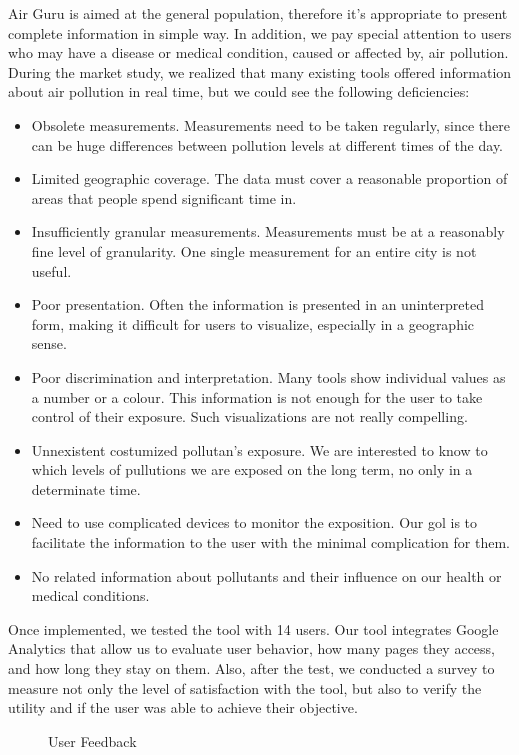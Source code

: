 Air Guru is aimed at the general population, therefore it's appropriate to present complete information in simple way. In addition, we pay special attention to users who may have a
disease or medical condition, caused or affected by, air pollution.
During the market study, we realized that many existing tools offered information about air pollution in real time, but we could see the following deficiencies:
\begin{itemize}
    \item Obsolete measurements. Measurements need to be taken regularly, since there can be huge differences
    between pollution levels at different times of the day.
    \item Limited geographic coverage. The data must cover a reasonable proportion of areas that people spend significant time in.
    \item Insufficiently granular measurements. Measurements must be at a reasonably fine level of granularity. One single measurement for an entire city is not useful.
    \item Poor presentation. Often the information is presented in an uninterpreted form, making it difficult for users to visualize, especially in a geographic sense.
    \item Poor discrimination and interpretation. Many tools show individual values as a number or a colour. This information is not
    enough for the user to take control of their exposure. Such visualizations are not really compelling. 
    \item Unnexistent costumized pollutan's exposure. We are interested to know to which levels of pullutions we are exposed on the long term, no only in a determinate time.
    \item Need to use complicated devices to monitor the exposition. Our gol is to facilitate the information to the user with the minimal complication for them.
    \item No related information about pollutants and their influence on our health or medical conditions.
\end{itemize}

Once implemented, we tested the tool with 14 users. Our tool integrates Google Analytics that allow us to evaluate
user behavior, how many pages they access, and how long they stay on them. Also, after the test, we conducted a survey to measure not only the level of satisfaction with the tool, but also to verify the utility and if the user was able to achieve their objective.
\begin{figure}[ht]
    \centering
    \hfill
  
  \caption{User Feedback}
    \end{figure}
 
